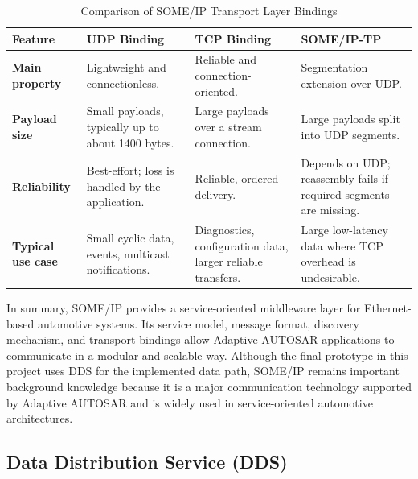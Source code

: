\begin{table}[h!]
\centering
\renewcommand{\arraystretch}{1.3}
\begin{tabularx}{\textwidth}{|l|X|X|X|}
\hline
\textbf{Feature} & \textbf{UDP Binding} & \textbf{TCP Binding} & \textbf{SOME/IP-TP} \\ \hline
\textbf{Main property} & Lightweight and connectionless. & Reliable and connection-oriented. & Segmentation extension over UDP. \\ \hline
\textbf{Payload size} & Small payloads, typically up to about 1400 bytes. & Large payloads over a stream connection. & Large payloads split into UDP segments. \\ \hline
\textbf{Reliability} & Best-effort; loss is handled by the application. & Reliable, ordered delivery. & Depends on UDP; reassembly fails if required segments are missing. \\ \hline
\textbf{Typical use case} & Small cyclic data, events, multicast notifications. & Diagnostics, configuration data, larger reliable transfers. & Large low-latency data where TCP overhead is undesirable. \\ \hline
\end{tabularx}
\caption{Comparison of SOME/IP Transport Layer Bindings}
\label{tab:someip_transport_comparison}
\end{table}

In summary, SOME/IP provides a service-oriented middleware layer for Ethernet-based automotive systems. Its service model, message format, discovery mechanism, and transport bindings allow Adaptive AUTOSAR applications to communicate in a modular and scalable way. Although the final prototype in this project uses DDS for the implemented data path, SOME/IP remains important background knowledge because it is a major communication technology supported by Adaptive AUTOSAR and is widely used in service-oriented automotive architectures.

\subsection{Data Distribution Service (DDS)}

